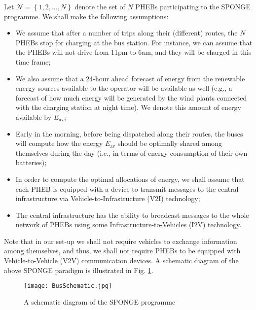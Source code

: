 \documentclass[journal]{IEEEtran}
\begin{document}
Let $\mathcal{N}=\left\{1,2,...,N\right\}$ denote the set of $N$ PHEBs participating to the SPONGE programme. We shall make the following assumptions:
\begin{itemize}
	\item
	We assume that after a number of trips along their (different) routes, the $N$ PHEBs stop for charging at the bus station. For instance, we can assume that the PHEBs will not drive from 11pm to 6am, and they will be charged in this time frame;
	\item
	We also assume that a 24-hour ahead forecast of energy from the renewable energy sources available to the operator will be available as well (e.g., a forecast of how much energy will be generated by the wind plants connected with the charging station at night time). We denote this amount of energy available by $E_{\textrm{av}}$;
	\item
	Early in the morning, before being dispatched along their routes, the buses will compute how the energy $E_{\textrm{av}}$ should be optimally shared among themselves during the day (i.e., in terms of energy consumption of their own batteries);
	\item
	In order to compute the optimal allocations of energy, we shall assume that each PHEB is equipped with a device to transmit messages to the central infrastructure via Vehicle-to-Infrastructure (V2I) technology;
	\item
	The central infrastructure has the ability to broadcast messages to the whole network of PHEBs using some Infrastructure-to-Vehicles (I2V) technology.
\end{itemize}
Note that in our set-up we shall not require vehicles to exchange information among themselves, and thus, we shall not require PHEBs to be equipped with Vehicle-to-Vehicle (V2V) communication devices. A schematic diagram of the above SPONGE paradigm is illustrated in Fig. \ref{feedbackLoop}.\newline
\begin{figure}[htbp]
	\begin{center}
		{\texttt{[image: BusSchematic.jpg]}}
		\caption{A schematic diagram of the SPONGE programme}
		\label{feedbackLoop}
	\end{center}
\end{figure}
\end{document}
